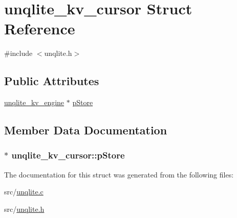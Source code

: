 \hypertarget{structunqlite__kv__cursor}{\section{unqlite\-\_\-kv\-\_\-cursor Struct Reference}
\label{d1/dd9/structunqlite__kv__cursor}
}


{\ttfamily \#include $<$unqlite.\-h$>$}

\subsection*{Public Attributes}
\begin{DoxyCompactItemize}
\item 
\hyperlink{structunqlite__kv__engine}{unqlite\-\_\-kv\-\_\-engine} $\ast$ \hyperlink{structunqlite__kv__cursor_ab59f256fd2442ce1ab1a8918322119c5}{p\-Store}
\end{DoxyCompactItemize}


\subsection{Member Data Documentation}
\hypertarget{structunqlite__kv__cursor_ab59f256fd2442ce1ab1a8918322119c5}{
\subsubsection[{p\-Store}]{ $\ast$ unqlite\-\_\-kv\-\_\-cursor\-::p\-Store}}\label{d1/dd9/structunqlite__kv__cursor_ab59f256fd2442ce1ab1a8918322119c5}


The documentation for this struct was generated from the following files\-:\begin{DoxyCompactItemize}
\item 
src/\hyperlink{unqlite_8c}{unqlite.\-c}\item 
src/\hyperlink{unqlite_8h}{unqlite.\-h}\end{DoxyCompactItemize}
